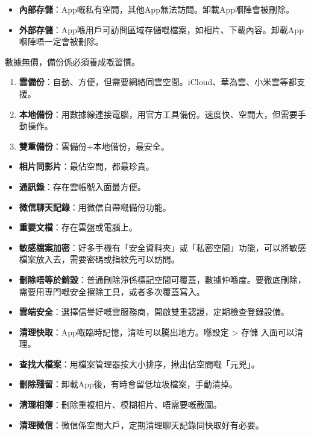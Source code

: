 
\begin{itemize}
  \item \textbf{內部存儲}：App嘅私有空間，其他App無法訪問。卸載App嗰陣會被刪除。
  \item \textbf{外部存儲}：App喺用戶可訪問區域存儲嘅檔案，如相片、下載內容。卸載App嗰陣唔一定會被刪除。
\end{itemize}


數據無價，備份係必須養成嘅習慣。


\begin{enumerate}
  \item \textbf{雲備份}：自動、方便，但需要網絡同雲空間。iCloud、華為雲、小米雲等都支援。
  \item \textbf{本地備份}：用數據線連接電腦，用官方工具備份。速度快、空間大，但需要手動操作。
  \item \textbf{雙重備份}：雲備份+本地備份，最安全。
\end{enumerate}


\begin{itemize}
  \item \textbf{相片同影片}：最佔空間，都最珍貴。
  \item \textbf{通訊錄}：存在雲帳號入面最方便。
  \item \textbf{微信聊天記錄}：用微信自帶嘅備份功能。
  \item \textbf{重要文檔}：存在雲盤或電腦上。
\end{itemize}


\begin{itemize}
  \item \textbf{敏感檔案加密}：好多手機有「安全資料夾」或「私密空間」功能，可以將敏感檔案放入去，需要密碼或指紋先可以訪問。
  \item \textbf{刪除唔等於銷毀}：普通刪除淨係標記空間可覆蓋，數據仲喺度。要徹底刪除，需要用專門嘅安全擦除工具，或者多次覆蓋寫入。
  \item \textbf{雲端安全}：選擇信譽好嘅雲服務商，開啟雙重認證，定期檢查登錄設備。
\end{itemize}


\begin{itemize}
  \item \textbf{清理快取}：App嘅臨時記憶，清咗可以騰出地方。喺設定 > 存儲 入面可以清理。
  \item \textbf{查找大檔案}：用檔案管理器按大小排序，揪出佔空間嘅「元兇」。
  \item \textbf{刪除殘留}：卸載App後，有時會留低垃圾檔案，手動清掉。
  \item \textbf{清理相簿}：刪除重複相片、模糊相片、唔需要嘅截圖。
  \item \textbf{清理微信}：微信係空間大戶，定期清理聊天記錄同快取好有必要。
\end{itemize}

